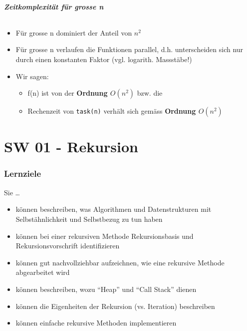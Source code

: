 \subsubsection{Zeitkomplexität für grosse n}
\paragraph{}
\begin{itemize}
    \item Für grosse n dominiert der Anteil von \textbf{$n^2$}
    \item Für grosse n verlaufen die Funktionen parallel, d.h. unterscheiden sich nur durch einen konstanten Faktor (vgl. logarith. Massstäbe!)
    \item Wir sagen:
    \begin{itemize}
        \item f(n) ist von der \textbf{Ordnung $O(n^2)$} bzw. die
        \item Rechenzeit von \texttt{task(n)} verhält sich gemäss \textbf{Ordnung $O(n^2)$}
    \end{itemize}
\end{itemize}
\paragraph{}

\part{SW 01 - Rekursion}
\section{Lernziele}
Sie \dots
\begin{itemize}
    \item können beschreiben, was Algorithmen und Datenstrukturen mit Selbstähnlichkeit und Selbstbezug zu tun haben
    \item können bei einer rekursiven Methode Rekursionsbasis und Rekursionsvorschrift identifizieren
    \item können gut nachvollziehbar aufzeichnen, wie eine rekursive Methode abgearbeitet wird
    \item können beschreiben, wozu "`Heap"' und "`Call Stack"' dienen
    \item können die Eigenheiten der Rekursion (vs. Iteration) beschreiben
    \item können einfache rekursive Methoden implementieren
\end{itemize}

